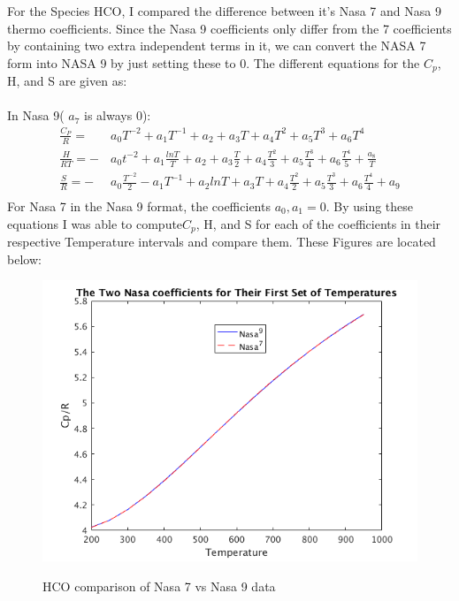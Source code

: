 \documentclass{article}
\newcommand\tab[1][1cm]{\hspace*{#1}}
\begin{document}
For the Species HCO, I compared the difference between it's Nasa 7 and Nasa 9 thermo coefficients. Since the Nasa 9 coefficients only differ from the 7 coefficients by containing two extra independent terms in it, we can convert the NASA 7 form into NASA 9 by just setting these to 0. The different equations for the $C_p$, H, and S are given as:\\
\\
\tab In Nasa 9( $a_7$ is always 0):
\begin{align*}
  \frac{C_P}{R} = \quad &a_0T^{-2} + a_1T^{-1} + a_2+a_3T + a_4T^2 + a_5T^3 + a_6T^4\\
  \frac{H}{RT} = -&a_0t^{-2} + a_1\frac{ln{T}}{T} + a_2 + a_3\frac{T}{2} + a_4\frac{T^2}{3} + a_5\frac{T^3}{4} + a_6\frac{T^4}{5} + \frac{a_8}{T}\\
  \frac{S}{R} =  -&a_0\frac{T^{-2}}{2} - a_1T^{-1} + a_2ln{T} + a_3T + a_4\frac{T^{2}}{2} + a_5\frac{T^3}{3} + a_6\frac{T^4}{4} + a_9\\
\end{align*}
\tab For Nasa 7 in the Nasa 9 format, the coefficients $a_0,a_1 = 0$. By using these equations I was able to compute$C_p$, H, and S for each of the coefficients in their respective Temperature intervals and compare them. These Figures are located below:

  \begin{figure}
  \centering
  \includegraphics[width=\textwidth]{Cp1.png}
  \label{fig:cp1}
  \caption{HCO comparison of Nasa 7 vs Nasa 9 data}
\end{figure}
\end{document}
